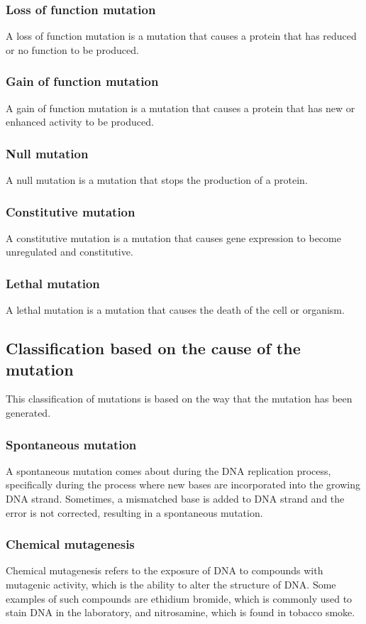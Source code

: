 \documentclass[11pt]{article}
\begin{document}
\subsubsection{Loss of function mutation}
\label{sec:org184b88b}
A loss of function mutation is a mutation that causes a protein that has reduced or no function to be produced.
\subsubsection{Gain of function mutation}
\label{sec:org64841c5}
A gain of function mutation is a mutation that causes a protein that has new or enhanced activity to be produced.
\subsubsection{Null mutation}
\label{sec:orga12ef4d}
A null mutation is a mutation that stops the production of a protein.
\subsubsection{Constitutive mutation}
\label{sec:orgba75ec1}
A constitutive mutation is a mutation that causes gene expression to become unregulated and constitutive.
\subsubsection{Lethal mutation}
\label{sec:orgda29b69}
A lethal mutation is a mutation that causes the death of the cell or organism.

\newpage
\subsection{Classification based on the cause of the mutation}
\label{sec:org92f02ba}
This classification of mutations is based on the way that the mutation has been generated.
\subsubsection{Spontaneous mutation}
\label{sec:orge007a89}
A spontaneous mutation comes about during the DNA replication process, specifically during the process where new bases are incorporated into the growing DNA strand. Sometimes, a mismatched base is added to DNA strand and the error is not corrected, resulting in a spontaneous mutation.
\subsubsection{Chemical mutagenesis}
\label{sec:org24cd363}
Chemical mutagenesis refers to the exposure of DNA to compounds with mutagenic activity, which is the ability to alter the structure of DNA. Some examples of such compounds are ethidium bromide, which is commonly used to stain DNA in the laboratory, and nitrosamine, which is found in tobacco smoke.
\end{document}

